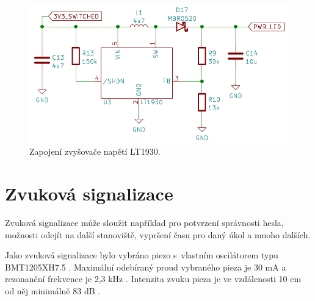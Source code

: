 \begin{figure}[!h]
  \begin{center}
    \includegraphics[scale=0.7]{obrazky/LT1930.png}
  \end{center}
  \caption[Zapojení zvyšovače napětí LT1930]{Zapojení zvyšovače napětí LT1930.}
\end{figure}

\section{Zvuková signalizace}
Zvuková signalizace může sloužit například pro potvrzení správnosti hesla, možnosti odejít na další stanoviště, vypršení času pro daný úkol a mnoho dalších. 

Jako zvuková signalizace bylo vybráno piezo s~vlastním oscilátorem typu \\BMT1205XH7.5 \cite{piezo_dtsh}. Maximální odebíraný proud vybraného pieza je 30 mA a rezonanční frekvence 
je 2,3 kHz \cite{piezo_dtsh}. Intenzita zvuku pieza je ve vzdálenosti 10 cm od něj minimálně 83 dB \cite{piezo_dtsh}.

